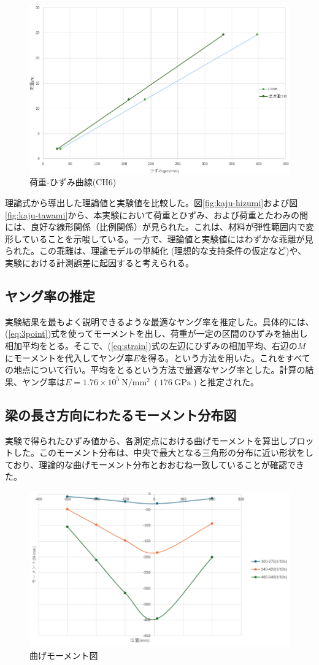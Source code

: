 \documentclass[a4j]{jarticle}
\begin{document}
\begin{figure}[H]
    \centering
    \includegraphics[width=0.8\linewidth]{summer/ship-experiment/bend/picture/ch6.png}
    \caption{荷重-ひずみ曲線(CH6)}
    \label{fig:ch6}
\end{figure}

理論式から導出した理論値と実験値を比較した。図\ref{fig:kaju-hizumi}および図\ref{fig:kaju-tawami}から、本実験において荷重とひずみ、および荷重とたわみの間には、良好な線形関係（比例関係）が見られた。これは、材料が弾性範囲内で変形していることを示唆している。一方で、理論値と実験値にはわずかな乖離が見られた。この乖離は、理論モデルの単純化 (理想的な支持条件の仮定など)や、実験における計測誤差に起因すると考えられる。

\subsection{ヤング率の推定}
実験結果を最もよく説明できるような最適なヤング率を推定した。具体的には、(\ref{eq:3point})式を使ってモーメントを出し、荷重が一定の区間のひずみを抽出し相加平均をとる。そこで、(\ref{eq:strain})式の左辺にひずみの相加平均、右辺の$M$にモーメントを代入してヤング率$E$を得る。という方法を用いた。これをすべての地点について行い。平均をとるという方法で最適なヤング率とした。計算の結果、ヤング率は$E = 1.76 \times 10^5 \ \mathrm{N/mm^2} \ (176 \ \mathrm{GPa})$と推定された。

\subsection{梁の長さ方向にわたるモーメント分布図}
実験で得られたひずみ値から、各測定点における曲げモーメントを算出しプロットした。このモーメント分布は、中央で最大となる三角形の分布に近い形状をしており、理論的な曲げモーメント分布とおおむね一致していることが確認できた。

\begin{figure}[H]
    \centering
    \includegraphics[width=0.5\linewidth]{summer/ship-experiment/bend/picture/moment.png}
    \caption{曲げモーメント図}
    \label{fig:bmd2}
\end{figure}
\end{document}
